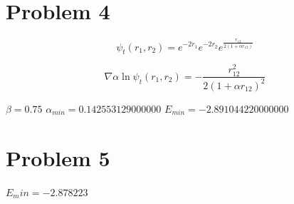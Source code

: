 \section*{Problem 4}

\begin{equation}
	\psi_t(r_1,r_2) = e^{-2r_1}e^{-2r_2}e^{\frac{r_{12}}{2(1+\alpha r_{12})}}
\end{equation}

\begin{equation}
	\nabla \alpha \ln{\psi_t(r_1,r_2)} = -\frac{r_{12}^2}{2(1+\alpha r_{12})^2}
\end{equation}

$\beta = 0.75$
$\alpha_{min}=0.142553129000000$
$E_{min}=-2.891044220000000$

\section*{Problem 5}

$E_min=-2.878223$






